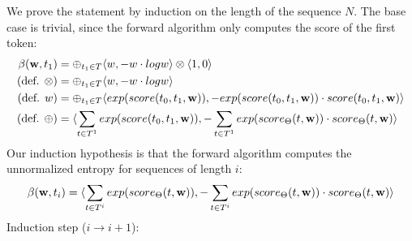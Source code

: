 \documentclass[a4paper,12pt]{ETHexercise}
\begin{document}
We prove the statement by induction on the length of the sequence $N$. The base case is trivial, since the forward algorithm only computes the score of the first token:
\begin{align}
    \beta(\textbf{w}, t_1) &= \oplus_{t_1 \in T} \langle w, -w \cdot logw\rangle \otimes \langle1, 0\rangle\\
    (\text{def. }\otimes) &= \oplus_{t_1 \in T} \langle w, -w \cdot logw\rangle \\
    (\text{def. }w) &= \oplus_{t_1 \in T}\langle exp(score(t_{0}, t_1, \textbf{w})), -exp(score(t_{0}, t_1, \textbf{w})) \cdot score(t_{0}, t_1, \textbf{w})\rangle\\
    (\text{def. }\oplus)&= \langle\sum_{t \in T^1}exp(score(t_{0}, t_1, \textbf{w})), -\sum_{t \in T^1} exp(score_\Theta(t,\textbf{w})) \cdot score_\Theta(t,\textbf{w})\rangle
\end{align}
Our induction hypothesis is that the forward algorithm computes the unnormalized entropy for sequences of length $i$:
\begin{align}
    \beta(\textbf{w}, t_i) = \langle\sum_{t \in T^i} exp(score_\Theta(t,\textbf{w})), -\sum_{t \in T^i} exp(score_\Theta(t,\textbf{w})) \cdot score_\Theta(t,\textbf{w})\rangle
\end{align}
Induction step ($i \rightarrow i+1$):
\end{document}
